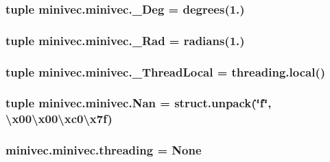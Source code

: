 \subsubsection[{\+\_\+\+Deg}]{\setlength{\rightskip}{0pt plus 5cm}tuple minivec.\+minivec.\+\_\+\+Deg = degrees(1.)}\label{namespaceminivec_1_1minivec_a5b26c80dbd4b8509096773b210c87c77}
\hypertarget{namespaceminivec_1_1minivec_ae5b62e1c8439d519f00ee982428624e1}{}
\subsubsection[{\+\_\+\+Rad}]{\setlength{\rightskip}{0pt plus 5cm}tuple minivec.\+minivec.\+\_\+\+Rad = radians(1.)}\label{namespaceminivec_1_1minivec_ae5b62e1c8439d519f00ee982428624e1}
\hypertarget{namespaceminivec_1_1minivec_a691948dad66644e76fcdfb576b7b01f2}{}
\subsubsection[{\+\_\+\+Thread\+Local}]{\setlength{\rightskip}{0pt plus 5cm}tuple minivec.\+minivec.\+\_\+\+Thread\+Local = threading.\+local()}\label{namespaceminivec_1_1minivec_a691948dad66644e76fcdfb576b7b01f2}
\hypertarget{namespaceminivec_1_1minivec_abf368b58aaa6bad7fa2c6f4100f5eefe}{}
\subsubsection[{Nan}]{\setlength{\rightskip}{0pt plus 5cm}tuple minivec.\+minivec.\+Nan = struct.\+unpack(\char`\"{}f\char`\"{}, \textquotesingle{}\textbackslash{}x00\textbackslash{}x00\textbackslash{}xc0\textbackslash{}x7f\textquotesingle{})}\label{namespaceminivec_1_1minivec_abf368b58aaa6bad7fa2c6f4100f5eefe}
\hypertarget{namespaceminivec_1_1minivec_acbf0347ca8872c1c7a543ef36a0bf52f}{}
\subsubsection[{threading}]{\setlength{\rightskip}{0pt plus 5cm}minivec.\+minivec.\+threading = None}\label{namespaceminivec_1_1minivec_acbf0347ca8872c1c7a543ef36a0bf52f}
